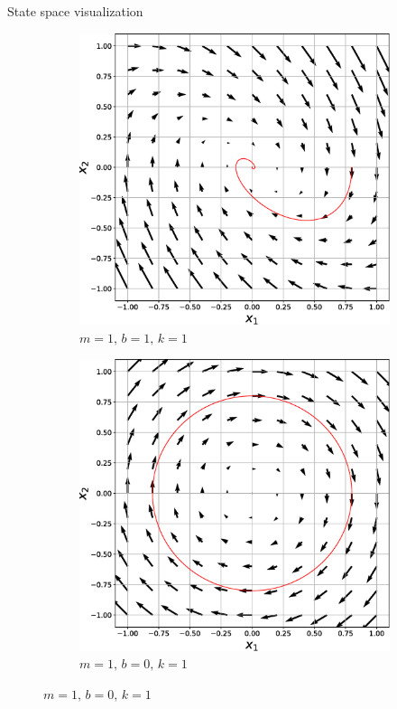 \documentclass[aspectratio=169]{beamer}
\begin{document}
\begin{frame}{State space visualization}
\begin{figure}
\begin{subfigure}[b]{0.3\textwidth}
        \includegraphics[width=\linewidth]{img/osc1.eps}
        \captionsetup{labelformat=empty}
        \caption{\small $m=1, \, b=1, \, k=1$}
        \label{fig:gull2}
    \end{subfigure}\hspace{0.1cm}
    \begin{subfigure}[b]{0.3\textwidth}
        \includegraphics[width=\linewidth]{img/osc.eps}
        \captionsetup{labelformat=empty}
        \caption{\small $m=1, \, b=0, \, k=1$}
        \label{fig:tiger}
    \end{subfigure}%
\end{figure}

\end{frame}
\end{document}
